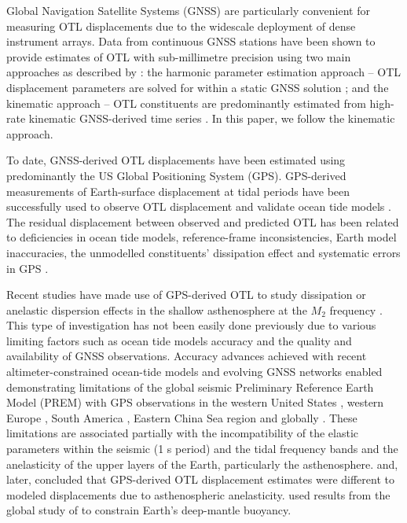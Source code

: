 \documentclass[se, manuscript]{copernicus}
\begin{document}
Global Navigation Satellite Systems (GNSS) are particularly convenient for measuring OTL displacements due to the widescale deployment of dense instrument arrays. Data from continuous GNSS stations have been shown to provide estimates of OTL with sub-millimetre precision using two main approaches as described by \cite{Penna2015}: the harmonic parameter estimation approach – OTL displacement parameters are solved for within a static GNSS solution \citep[e.g.,][]{Schenewerk2001,Allinson2004,King2005,Thomas2006,Yuan2012,Yuan2013}; and the kinematic approach – OTL constituents are predominantly estimated from high-rate kinematic GNSS-derived time series \citep[e.g.,][]{Khan2001,King2003,King2006,Penna2015,Martens2016,Wang2019}. In this paper, we follow the kinematic approach.

To date, GNSS-derived OTL displacements have been estimated using predominantly the US Global Positioning System (GPS). GPS-derived measurements of Earth-surface displacement at tidal periods have been successfully used to observe OTL displacement and validate ocean tide models \citep{Urschl2005,King2005}. The residual displacement between observed and predicted OTL has been related to deficiencies in ocean tide models, reference-frame inconsistencies, Earth model inaccuracies, the unmodelled constituents’ dissipation effect and systematic errors in GPS \citep[e.g.,][]{Thomas2006,Ito2011,Yuan2013,Bos2015}.

Recent studies have made use of GPS-derived OTL to study dissipation or anelastic dispersion effects in the shallow asthenosphere at the $M_2$ frequency \citep[e.g.][]{Bos2015}. This type of investigation has not been easily done previously due to various limiting factors such as ocean tide models accuracy and the quality and availability of GNSS observations. Accuracy advances achieved with recent altimeter-constrained ocean-tide models \citep{Stammer2014} and evolving GNSS networks enabled demonstrating limitations of the global seismic Preliminary Reference Earth Model (PREM) \citep{Dziewonski1981} with GPS observations in the western United States \citep{Ito2011,Yuan2012}, western Europe \citep{Bos2015}, South America \citep{Martens2016}, Eastern China Sea region \citep{Wang2019} and globally \citep{Yuan2013}. These limitations are associated partially with the incompatibility of the elastic parameters within the seismic (1 s period) and the tidal frequency bands and the anelasticity of the upper layers of the Earth, particularly the asthenosphere. \cite{Bos2015} and, later, \cite{Wang2019} concluded that GPS-derived OTL displacement estimates were different to modeled displacements due to asthenospheric anelasticity. \cite{Lau2017} used results from the global study of \cite{Yuan2013} to constrain Earth’s deep-mantle buoyancy.
\end{document}
